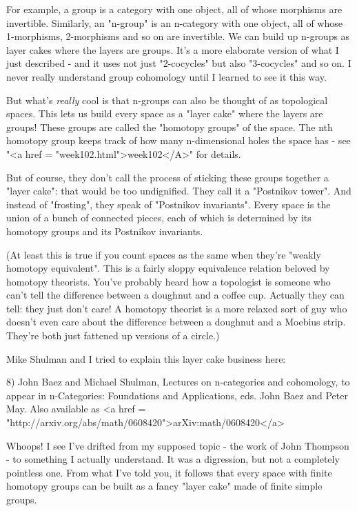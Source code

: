 For example, a group is a category with one object, all of whose
morphisms are invertible.  Similarly, an "n-group" is an
n-category with one object, all of whose 1-morphisms, 2-morphisms and
so on are invertible.  We can build up n-groups as layer cakes where
the layers are groups.  It's a more elaborate version of what I just
described - and it uses not just "2-cocycles" but also
"3-cocycles" and so on.  I never really understand group
cohomology until I learned to see it this way.

But what's \emph{really} cool is that n-groups can also be thought
of as topological spaces.  This lets us build every space as a
"layer cake" where the layers are groups!  These groups are
called the "homotopy groups" of the space.  The nth homotopy
group keeps track of how many n-dimensional holes the space has - see
"<a href = "week102.html">week102</A>" for details.

But of course, they don't call the process of sticking these groups
together a "layer cake": that would be too undignified.
They call it a "Postnikov tower".  And instead of
"frosting", they speak of "Postnikov invariants".
Every space is the union of a bunch of connected pieces, each of which
is determined by its homotopy groups and its Postnikov invariants.

(At least this is true if you count spaces as the same when they're
"weakly homotopy equivalent".  This is a fairly sloppy equivalence
relation beloved by homotopy theorists.  You've probably heard
how a topologist is someone who can't tell the difference between
a doughnut and a coffee cup.  Actually they can tell: they just
don't care!  A homotopy theorist is a more relaxed sort of guy
who doesn't even care about the difference between a doughnut 
and a Moebius strip.  They're both just fattened up versions of a 
circle.)

Mike Shulman and I tried to explain this layer cake business here:

8) John Baez and Michael Shulman, Lectures on n-categories
and cohomology, to appear in n-Categories: Foundations and 
Applications, eds. John Baez and Peter May.  Also available
as <a href = "http://arxiv.org/abs/math/0608420">arXiv:math/0608420</a>

Whoops!  I see I've drifted from my supposed topic - the work of 
John Thompson - to something I actually understand.
It was a digression, but not a completely pointless one.  From 
what I've told you, it follows that every space with finite 
homotopy groups can be built as a fancy "layer cake" made of
finite simple groups.  

